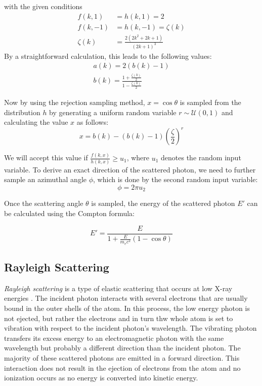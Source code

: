 with the given conditions
\begin{align*}
    f(k,1) &= h(k,1) = 2 \\
    f(k,-1) &= h(k,-1) = \zeta(k) \\
    \zeta(k) &= \frac{2(2k^2 + 2k + 1)}{(2k + 1)^3}
\end{align*}
By a straightforward calculation, this leads to the following values\cite{ozmutlu1992sampling}:
\begin{align*}
    a(k) = 2(b(k)-1) \\
    b(k) = \frac{1+\frac{\zeta(k)}{2}}{1-\frac{\zeta(k)}{2}}
\end{align*}

Now by using the rejection sampling method, $x=\cos\theta$ is sampled from the distribution $h$ by generating a uniform random variable $r \sim \mathcal{U}(0,1)$ and calculating the value $x$ as follows:
\begin{equation}
    x = b(k)- (b(k)-1) \left(\frac{\zeta}{2}\right)^r
\end{equation}

We will accept this value if $\frac{f(k,x)}{h(k,x)} \geq u_1$, where $u_1$ denotes the random input variable. To derive an exact direction of the scattered photon, we need to further sample an azimuthal angle $\phi$, which is done by the second random input variable:
\begin{equation}
    \label{eq:azimuthal_angle}
    \phi = 2\pi u_2
\end{equation}

Once the scattering angle $\theta$ is sampled, the energy of the scattered
photon $E'$ can be calculated using the Compton formula:

\begin{equation}
    \label{eq:compton_energy}
    E' = \frac{E}{1 + \frac{E}{m_e c^2} (1 - \cos \theta)}
\end{equation}

\subsection{Rayleigh Scattering}
\emph{Rayleigh scattering} is a type of elastic scattering that occurs at low X-ray energies \cite[Chap. 7]{medicalImagingSystemsIntro2019:}. The incident photon interacts with several electrons that are
usually bound in the outer shells of the atom. In this process, the low energy photon is not ejected, but rather the electrons and in turn thw whole atom is
set to vibration with respect to the incident photon’s wavelength. The vibrating photon transfers its excess energy to an electromagnetic photon with the same wavelength but probably a different direction than the incident photon. The majority of these scattered photons are emitted in a forward direction. This interaction does not result in the ejection of electrons from the atom and no ionization occurs as no energy is converted into kinetic energy.

